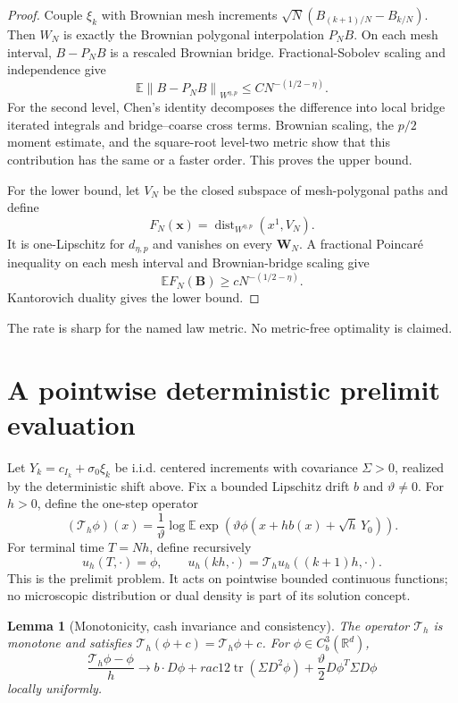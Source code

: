 \documentclass[11pt,reqno]{amsart}
\newtheorem{lemma}[theorem]{Lemma}
\theoremstyle{definition}
\theoremstyle{remark}
\newcommand{\E}{\mathbb E}
\newcommand{\R}{\mathbb R}
\newcommand{\tr}{\operatorname{tr}}
\newcommand{\dist}{\operatorname{dist}}
\newcommand{\norm}[1]{\left\lVert #1\right\rVert}
\begin{document}
\begin{proof}
Couple $\xi_k$ with Brownian mesh increments
$\sqrt N(B_{(k+1)/N}-B_{k/N})$.  Then $W_N$ is exactly the Brownian polygonal
interpolation $P_NB$.  On each mesh interval, $B-P_NB$ is a rescaled Brownian
bridge.  Fractional-Sobolev scaling and independence give
\[
 \E\norm{B-P_NB}_{W^{\eta,p}}
 \le C N^{-(1/2-\eta)}.
\]
For the second level, Chen's identity decomposes the difference into local
bridge iterated integrals and bridge--coarse cross terms.  Brownian scaling,
the $p/2$ moment estimate, and the square-root level-two metric show that this
contribution has the same or a faster order.  This proves the upper bound.

For the lower bound, let $V_N$ be the closed subspace of mesh-polygonal paths
and define
\[
 F_N(\mathbf x)=\dist_{W^{\eta,p}}(x^1,V_N).
\]
It is one-Lipschitz for $d_{\eta,p}$ and vanishes on every $\mathbf W_N$.
A fractional Poincar\'e inequality on each mesh interval and Brownian-bridge
scaling give
\[
 \E F_N(\mathbf B)\ge cN^{-(1/2-\eta)}.
\]
Kantorovich duality gives the lower bound.
\end{proof}

The rate is sharp for the named law metric.  No metric-free optimality is
claimed.

\section{A pointwise deterministic prelimit evaluation}\label{sec:scheme}

Let $Y_k=c_{I_k}+\sigma_0\xi_k$ be i.i.d. centered increments with covariance
$\Sigma>0$, realized by the deterministic shift above.  Fix a bounded
Lipschitz drift $b$ and $\vartheta\ne0$.  For $h>0$, define the one-step
operator
\begin{equation}\label{eq:Th}
 (\mathcal T_h\phi)(x)
 =\frac1\vartheta\log\E\exp\left(
 \vartheta\phi(x+hb(x)+\sqrt h\,Y_0)\right).
\end{equation}
For terminal time $T=Nh$, define recursively
\begin{equation}\label{eq:recursion}
 u_h(T,\cdot)=\phi,
 \qquad
 u_h(kh,\cdot)=\mathcal T_hu_h((k+1)h,\cdot).
\end{equation}
This is the prelimit problem.  It acts on pointwise bounded continuous
functions; no microscopic distribution or dual density is part of its
solution concept.

\begin{lemma}[Monotonicity, cash invariance and consistency]\label{lem:scheme}
The operator $\mathcal T_h$ is monotone and satisfies
$\mathcal T_h(\phi+c)=\mathcal T_h\phi+c$.  For
$\phi\in C_b^3(\R^d)$,
\begin{equation}\label{eq:consistency}
 \frac{\mathcal T_h\phi-\phi}{h}
 \longrightarrow
 b\cdot D\phi+rac12\tr(\Sigma D^2\phi)
 +\frac\vartheta2D\phi^T\Sigma D\phi
\end{equation}
locally uniformly.
\end{lemma}
\end{document}
